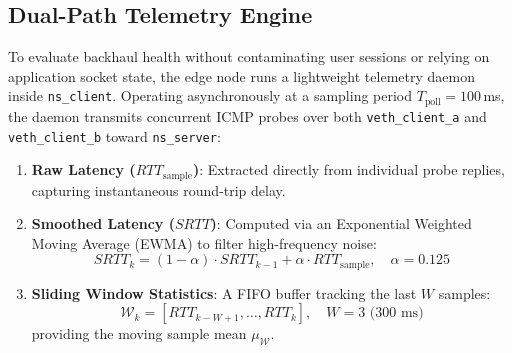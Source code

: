 \documentclass[conference]{IEEEtran}
\begin{document}
\textcolor{extensioncolor}{
\subsection{Dual-Path Telemetry Engine}
To evaluate backhaul health without contaminating user sessions or relying on application socket state, the edge node runs a lightweight telemetry daemon inside \texttt{ns\_client}. Operating asynchronously at a sampling period $T_{\text{poll}} = 100$\,ms, the daemon transmits concurrent ICMP probes over both \texttt{veth\_client\_a} and \texttt{veth\_client\_b} toward \texttt{ns\_server}:
\begin{enumerate}
    \item \textbf{Raw Latency ($RTT_{\text{sample}}$)}: Extracted directly from individual probe replies, capturing instantaneous round-trip delay.
    \item \textbf{Smoothed Latency ($SRTT$)}: Computed via an Exponential Weighted Moving Average (EWMA) to filter high-frequency noise:
    \begin{equation}
    SRTT_k = (1 - \alpha) \cdot SRTT_{k-1} + \alpha \cdot RTT_{\text{sample}}, \quad \alpha = 0.125
    \end{equation}
    \item \textbf{Sliding Window Statistics}: A FIFO buffer tracking the last $W$ samples:
    \begin{equation}
    \mathcal{W}_k = [RTT_{k-W+1}, \dots, RTT_k], \quad W = 3\text{ (300 ms)}
    \end{equation}
    providing the moving sample mean $\mu_{\mathcal{W}}$.
\end{enumerate}
}
\end{document}
